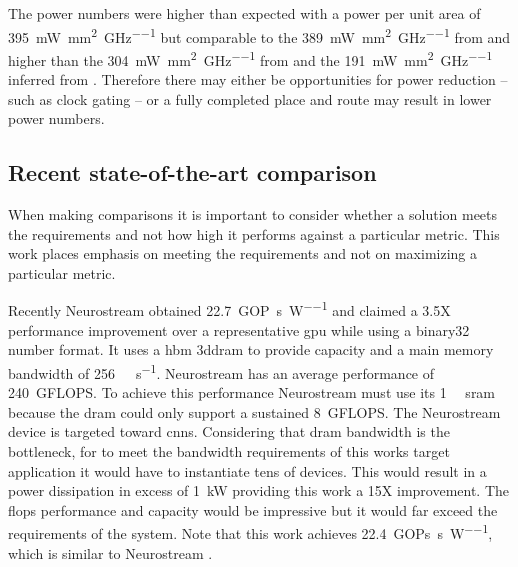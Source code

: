 The power numbers were higher than expected %
with a power per unit area of \SI[per-mode=symbol]{395}{\milli\watt\per\square\milli\meter\per\giga\hertz} but comparable to the \SI[per-mode=symbol]{389}{\milli\watt\per\square\milli\meter\per\giga\hertz} from \cite{chen2016diannao} and higher than the \SI[per-mode=symbol]{304}{\milli\watt\per\square\milli\meter\per\giga\hertz} from \cite{azarkhish2017neurostream} and the \SI[per-mode=symbol]{191}{\milli\watt\per\square\milli\meter\per\giga\hertz} inferred from \cite{tensorflow2015-whitepaper}.
Therefore there may either be opportunities for power reduction -- such as clock gating -- or a fully completed place and route may result in lower power numbers.

\subsection{Recent state-of-the-art comparison}
\label{sec:State-of-the-art Comparison}
When making comparisons it is important to consider whether a solution meets the requirements and not how high it performs against a particular metric.
This work places emphasis on meeting the requirements and not on maximizing a particular metric.

Recently Neurostream \cite{azarkhish2017neurostream} obtained \SI[per-mode=symbol]{22.7}{\giga OP\per\second\per\watt} and claimed a 3.5X performance improvement over a representative \ac{gpu} while using a \ac{binary32} number format.
It uses a \ac{hbm} \ac{3ddram} to provide capacity and a main memory bandwidth of \SI[per-mode=symbol]{256}{\giga\bit\per\second}. Neurostream has an average performance of \SI[per-mode=symbol]{240}{\giga FLOPS}.
To achieve this performance Neurostream must use its \SI[per-mode=symbol]{1}{\mega\bit} \ac{sram} because the \ac{dram} could only support a sustained \SI[per-mode=symbol]{8}{\giga FLOPS}.
The Neurostream device is targeted toward \acp{cnn}.
Considering that \ac{dram} bandwidth is the bottleneck, for \cite{azarkhish2017neurostream} to meet the bandwidth requirements of this works target application it would have to instantiate tens of devices.
This would result in a power dissipation in excess of \SI[per-mode=symbol]{1}{\kilo\watt} providing this work a 15X improvement.
The \acp{flop} performance and capacity would be impressive but it would far exceed the requirements of the system.
Note that this work achieves \SI[per-mode=symbol]{22.4}{\giga OPs\per\second\per\watt}, which is similar to Neurostream \cite{azarkhish2017neurostream}.

